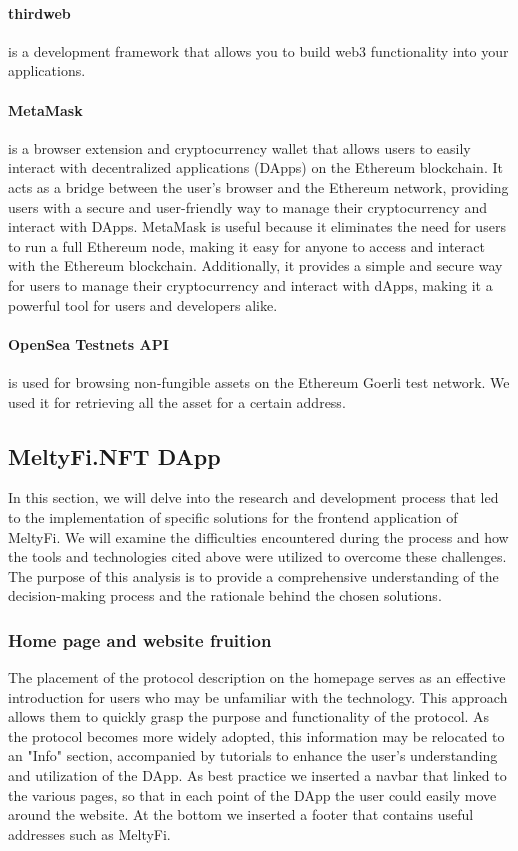 \paragraph{thirdweb} is a development framework that allows you to build web3 functionality into your applications. \cite{thirdweb}
\paragraph{MetaMask} is a browser extension and cryptocurrency wallet that allows users to easily interact with decentralized applications (DApps) on the Ethereum blockchain. 
It acts as a bridge between the user's browser and the Ethereum network, providing users with a secure and user-friendly way to manage their cryptocurrency and interact with DApps. MetaMask is useful because it eliminates the need for users to run a full Ethereum node, making it easy for anyone to access and interact with the Ethereum blockchain. Additionally, it provides a simple and secure way for users to manage their cryptocurrency and interact with dApps, making it a powerful tool for users and developers alike. \cite{metamask}
\paragraph{OpenSea Testnets API} is used for browsing non-fungible assets on the Ethereum Goerli test network. We used it for retrieving all the asset for a certain address. \cite{testnetsAPI}

\subsection{MeltyFi.NFT DApp}
In this section, we will delve into the research and development process that led to the implementation of specific solutions for the frontend application of MeltyFi. We will examine the difficulties encountered during the process and how the tools and technologies cited above were utilized to overcome these challenges. The purpose of this analysis is to provide a comprehensive understanding of the decision-making process and the rationale behind the chosen solutions.

\subsubsection{Home page and website fruition}
The placement of the protocol description on the homepage serves as an effective introduction for users who may be unfamiliar with the technology. 
This approach allows them to quickly grasp the purpose and functionality of the protocol.
As the protocol becomes more widely adopted, this information may be relocated to an "Info" section, accompanied by tutorials to enhance the user's understanding and utilization of the DApp.
As best practice we inserted a navbar that linked to the various pages, so that in each point of the DApp the user could easily move around the website. 
At the bottom we inserted a footer that contains useful addresses such as MeltyFi. 

